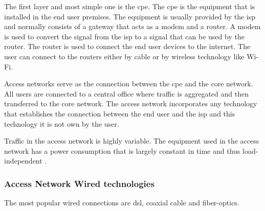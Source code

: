 The first layer and most simple one is the \ac{cpe}. The \ac{cpe} is the equipment that is installed in the end user premises. 
The equipment is usually provided by the \ac{isp} and normally consists of a gateway that acts as a modem and a router.
A modem is used to convert the signal from the \ac{isp} to a signal that can be used by the router. The router is used to connect the end user devices to the internet. The user can connect to the routers either by cable or by wireless technology like Wi-Fi. 

Access networks serve as the connection between the \ac{cpe} and the core network. All users are connected to a central office where traffic is aggregated and then transferred to the core network.
The access network incorporates any technology that establishes the connection between the end user and the \ac{isp} and this technology it is not own by the user. %

Traffic in the access network is highly variable. The equipment used in the access network has a power consumption that is largely constant in time and thus load-independent \cite{Vereecken2011}.

\subsubsection{Access Network Wired technologies}

The most popular wired connections are \ac{dsl}, coaxial cable and fiber-optics.

